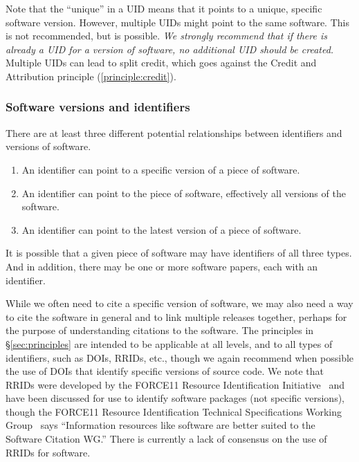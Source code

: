 \documentclass[12pt, oneside]{amsart}
\newcommand{\katznote}[1]{ {\textcolor{blue} { ***DSK: #1 }}} %
\newcommand{\LJHnote}[1]{ {\textcolor{fuschsia} { ***LJH: #1 }}} %
\begin{document}
Note that the ``unique'' in a UID means that it points to a unique, specific software version. However, multiple UIDs might point to the same software.
This is not recommended, but is possible.
\textit{We strongly recommend that if there is already a UID for a version of software, no additional UID should be created.}
Multiple UIDs can lead to split credit, which goes against the Credit and Attribution principle (\ref{principle:credit}).


\subsubsection*{Software versions and identifiers}

There are at least three different potential relationships between identifiers and versions of software.
\begin{enumerate}
\item An identifier can point to a specific version of a piece of software.
\item An identifier can point to the piece of software, effectively all versions of the software.
\item An identifier can point to the latest version of a piece of software.
\end{enumerate}
It is possible that a given piece of software may have identifiers of all three types.  And in addition,
there may be one or more software papers, each with an identifier.

While we often need to cite a specific version of software, we may also need a way to cite the
software in general and to link multiple releases together, perhaps for
the purpose of understanding citations to the software.  The principles in \S\ref{sec:principles} are
intended to be applicable at all levels, and to all types of identifiers, such as DOIs, RRIDs, etc.,
though we again recommend when possible the use of DOIs that identify specific versions of
source code.  We note that RRIDs were developed by the FORCE11 Resource Identification Initiative~\cite{f11rii}
and have been discussed for use to identify software packages (not specific versions),
though the FORCE11 Resource Identification Technical Specifications Working
Group~\cite{f11rrridtswg} says ``Information resources like software are better suited to
the Software Citation WG.''
There is currently a lack of consensus on the use of RRIDs for software.
\end{document}
